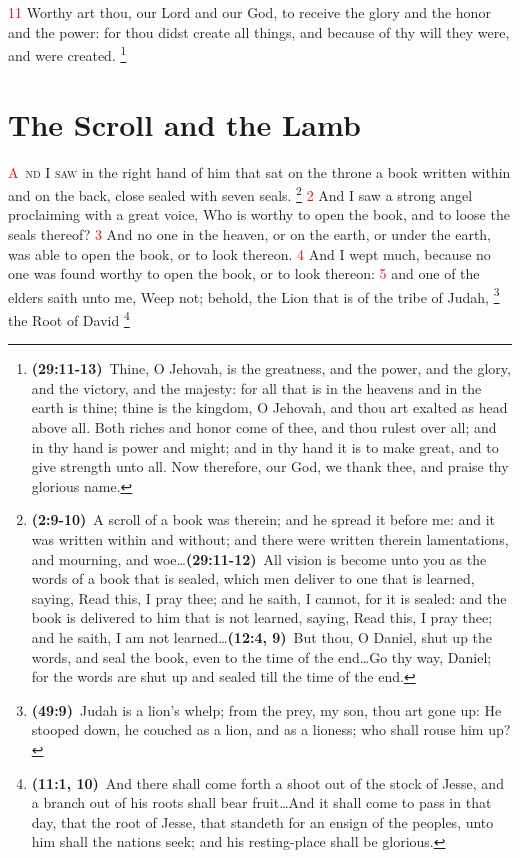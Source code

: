 \documentclass[12pt,twoside]{memoir}
\newcommand{\cbibleref}[3]{\textbf{\ibibleverse{#1}(#2)}\ {#3}}
\newcommand{\cbiblefoot}[3]{\footnote{\cbibleref{#1}{#2}{#3}}}
\newcommand{\cbiblefoottrio}[9]{\footnote{\cbibleref{#1}{#2}{#3}\ldots \cbibleref{#4}{#5}{#6}\ldots \cbibleref{#7}{#8}{#9}}}
\newcommand{\vnum}[1]{\textcolor{red}{\normalsize{#1}}}
\begin{document}
\vnum{11} Worthy art thou, our Lord and our God, to receive the glory and the honor and the power: for thou didst create all things, and because of thy will they were, and were created.%
	\cbiblefoot{IChronicles}{29:11-13}{Thine, O Jehovah, is the greatness, and the power, and the glory, and the victory, and the majesty: for all that is in the heavens and in the earth is thine; thine is the kingdom, O Jehovah, and thou art exalted as head above all. Both riches and honor come of thee, and thou rulest over all; and in thy hand is power and might; and in thy hand it is to make great, and to give strength unto all. Now therefore, our God, we thank thee, and praise thy glorious name.}


\chapter{The Scroll and the Lamb}
\lettrine[lines=3,slope=0.5em]{\textcolor{red}{A}}{\ nd I saw} in the right hand of him that sat on the throne a book written within and on the back, close sealed with seven seals.%
 \cbiblefoottrio{Ezekiel}{2:9-10}{A scroll of a book was therein; and he spread it before me: and it was written within and without; and there were written therein lamentations, and mourning, and woe}%
 					{Isaiah}{29:11-12}{All vision is become unto you as the words of a book that is sealed, which men deliver to one that is learned, saying, Read this, I pray thee; and he saith, I cannot, for it is sealed: and the book is delivered to him that is not learned, saying, Read this, I pray thee; and he saith, I am not learned}%
 					{Daniel}{12:4, 9}{But thou, O Daniel, shut up the words, and seal the book, even to the time of the end\ldots Go thy way, Daniel; for the words are shut up and sealed till the time of the end.} %
\vnum{2} And I saw a strong angel proclaiming with a great voice, Who is worthy to open the book, and to loose the seals thereof? %
\vnum{3} And no one in the heaven, or on the earth, or under the earth, was able to open the book, or to look thereon. %
\vnum{4} And I wept much, because no one was found worthy to open the book, or to look thereon: %
\vnum{5} and one of the elders saith unto me, Weep not; behold, the Lion that is of the tribe of Judah,%
	\cbiblefoot{Genesis}{49:9}{Judah is a lion's whelp; from the prey, my son, thou art gone up: He stooped down, he couched as a lion, and as a lioness; who shall rouse him up?}
 the Root of David%
 	\cbiblefoot{Isaiah}{11:1, 10}{And there shall come forth a shoot out of the stock of Jesse, and a branch out of his roots shall bear fruit\ldots And it shall come to pass in that day, that the root of Jesse, that standeth for an ensign of the peoples, unto him shall the nations seek; and his resting-place shall be glorious.}
\end{document}
